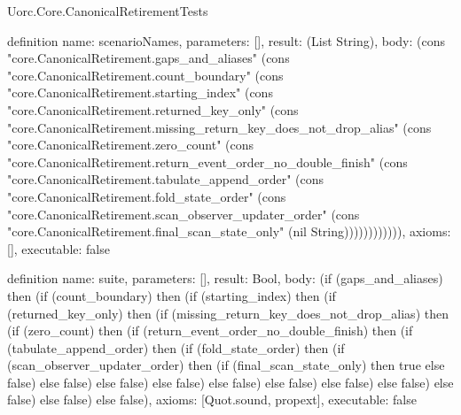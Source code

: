 \begin{lexlean}{Uorc.Core.CanonicalRetirementTests}
\begin{semanticmodule}
definition{
  name: scenarioNames,
  parameters: [],
  result: (List String),
  body: (cons "core.CanonicalRetirement.gaps_and_aliases" (cons "core.CanonicalRetirement.count_boundary" (cons "core.CanonicalRetirement.starting_index" (cons "core.CanonicalRetirement.returned_key_only" (cons "core.CanonicalRetirement.missing_return_key_does_not_drop_alias" (cons "core.CanonicalRetirement.zero_count" (cons "core.CanonicalRetirement.return_event_order_no_double_finish" (cons "core.CanonicalRetirement.tabulate_append_order" (cons "core.CanonicalRetirement.fold_state_order" (cons "core.CanonicalRetirement.scan_observer_updater_order" (cons "core.CanonicalRetirement.final_scan_state_only" (nil String)))))))))))),
  axioms: [],
  executable: false
}

definition{
  name: suite,
  parameters: [],
  result: Bool,
  body: (if (gaps_and_aliases) then (if (count_boundary) then (if (starting_index) then (if (returned_key_only) then (if (missing_return_key_does_not_drop_alias) then (if (zero_count) then (if (return_event_order_no_double_finish) then (if (tabulate_append_order) then (if (fold_state_order) then (if (scan_observer_updater_order) then (if (final_scan_state_only) then true else false) else false) else false) else false) else false) else false) else false) else false) else false) else false) else false),
  axioms: [Quot.sound, propext],
  executable: false
}
\end{semanticmodule}
\end{lexlean}
